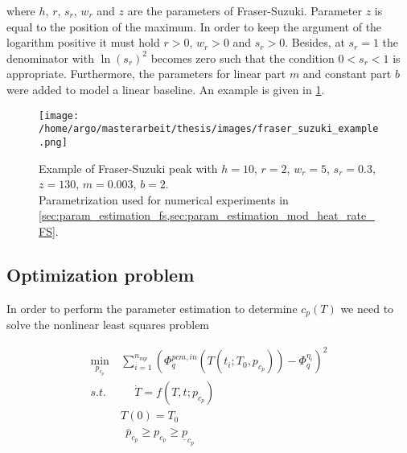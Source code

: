 \documentclass{scrartcl}[12pt, halfparskip]
\numberwithin{equation}{section}
\numberwithin{figure}{section}
\numberwithin{table}{section}
\begin{document}
where $h$, $r$, $s_r$, $w_r$ and $z$ are the parameters of Fraser-Suzuki. 
Parameter $z$ is equal to the position of the maximum.
In order to keep the argument of the logarithm positive it must hold $r > 0$, $w_r > 0$ and $s_r > 0$. Besides, at $s_r = 1$ the denominator with $\ln(s_r)^2$ becomes zero such that the condition $0 < s_r < 1$ is appropriate. Furthermore, the parameters for linear part $m$ and constant part $b$ were added to model a linear baseline. An example is given in \cref{fig:parametrization_example_fraser_suzuki}.

\begin{figure}[H]
	\centering
	\texttt{[image: /home/argo/masterarbeit/thesis/images/fraser\_suzuki\_example.png]}
	\caption{Example of Fraser-Suzuki peak with $h=10$, $r=2$, $w_r=5$, $s_r=0.3$, $z=130$, $m=0.003$, $b=2$. \\
	Parametrization used for numerical experiments in \cref{sec:param_estimation_fs,sec:param_estimation_mod_heat_rate_FS}.}
	\label{fig:parametrization_example_fraser_suzuki}
\end{figure}











\newpage
\subsection{Optimization problem}
\label{sec:optimization_problem}
In order to perform the parameter estimation to determine $c_p(T)$ we need to solve the nonlinear least squares problem

\begin{align}
	\min_{p_{c_p}} \ & \sum_{i=1}^{n_{mp}} \left(  \varPhi_{q}^{pcm,in}(T(t_i;T_0,p_{c_p})) - \varPhi_q^{\eta_i} \right)^2 \label{eq:parameter_estimation_least_squares_problem} \\
	s.t. \ & \quad \  \dot{T} = f(T,t;p_{c_p}) \nonumber \\
	& T(0) = T_0 \nonumber \\
	& \ \ \bar{p}_{c_p} \ge p_{c_p} \ge \underline{p}_{c_p} \nonumber
\end{align}
\end{document}
